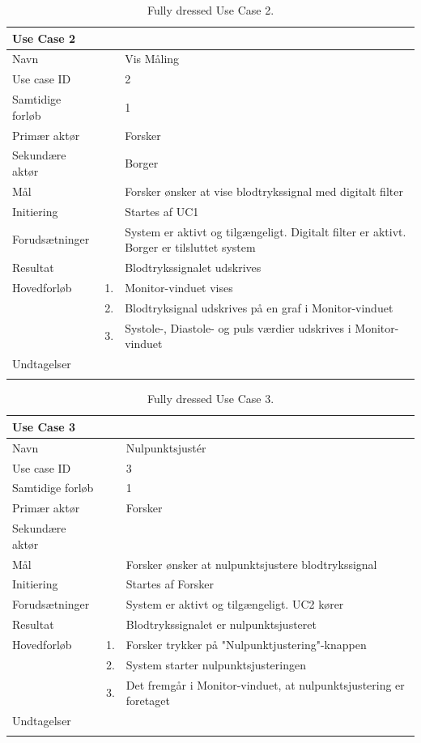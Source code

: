 \begin{longtabu} to  %
    {\large \textbf{Use Case 2}} && \\
    \toprule
    Navn &&    Vis Måling\\
    Use case ID &&    2\\
    Samtidige forløb &&    1\\
    Primær aktør &&    Forsker\\
    Sekundære aktør &&	 Borger\\
    Mål &&    Forsker ønsker at vise blodtrykssignal med digitalt filter\\
    Initiering &&	Startes af UC1\\
    Forudsætninger &&  System er aktivt og tilgængeligt. Digitalt filter er aktivt. Borger er tilsluttet system\\
    Resultat &&		Blodtrykssignalet udskrives                         \\ \midrule
    Hovedforløb &    1. &    Monitor-vinduet vises\\[-1ex]	
    			&    2. &    Blodtryksignal udskrives på en graf i 	  Monitor-vinduet\\[-1ex]
    			&	 3.	&	 Systole-, Diastole- og puls	værdier udskrives i Monitor-vinduet\newline\\ \midrule
                
    Undtagelser &    &   \\ \bottomrule
\caption{Fully dressed Use Case 2.}
\label{UC2}
\end{longtabu}


\begin{longtabu} to  %
    {\large \textbf{Use Case 3}} && \\
    \toprule
    Navn &&    Nulpunktsjustér\\
    Use case ID &&    3\\
    Samtidige forløb &&    1\\
    Primær aktør &&    Forsker\\
    Sekundære aktør && \\
    Mål &&    Forsker ønsker at nulpunktsjustere blodtrykssignal\\
    Initiering &&	Startes af Forsker\\
    Forudsætninger &&  System er aktivt og tilgængeligt. UC2 kører \\    Resultat &&		Blodtrykssignalet er nulpunktsjusteret\\ \midrule
    Hovedforløb &    1. &    Forsker trykker på "Nulpunktjustering"\--knappen\\[-1ex]   						 	
                &    2. &    System starter nulpunktsjusteringen\\[-1ex]
                &	 3.	&	 Det fremgår i Monitor-vinduet, at nulpunktsjustering er foretaget\newline\\ \midrule
                
    Undtagelser &     &      \\ \bottomrule
\caption{Fully dressed Use Case 3.}
\label{UC3}
\end{longtabu}

